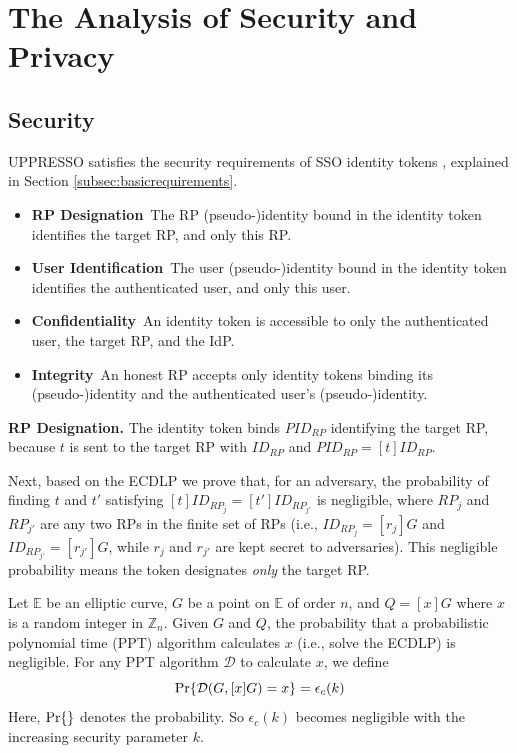 \section{The Analysis of Security and Privacy}
\label{sec:analysis}


\subsection{Security}
UPPRESSO satisfies the security requirements of SSO identity tokens \cite{ArmandoCCCT08,FettKS16, FettKS17},
     explained in Section \ref{subsec:basicrequirements}.
\begin{itemize}
\setlength{\topsep}{0pt}
\setlength{\partopsep}{0pt}
\setlength{\itemsep}{0pt}
\setlength{\parsep}{0pt}
\setlength{\parskip}{0pt}
\item  \textbf{RP Designation}~The RP (pseudo-)identity bound in the identity token
     identifies the target RP, and only this RP.
\item \textbf{User Identification}~The user (pseudo-)identity bound in the identity token identifies
        the authenticated user, and only this user.
\item \textbf{Confidentiality}~An identity token
    is accessible to only
                the authenticated user, the target RP, and the IdP.
\item \textbf{Integrity}~An honest RP accepts only identity tokens binding its (pseudo-)identity and the authenticated user's (pseudo-)identity.
\end{itemize}


\noindent\textbf{RP Designation.}
The identity token binds $PID_{RP}$ identifying the target RP,
    because $t$ is sent to the target RP with $ID_{RP}$ and $PID_{RP} = [t]ID_{RP}$.


Next, based on the ECDLP
    we prove that,
    for an adversary,
        the probability of finding $t$ and $t'$
    satisfying $[t]ID_{RP_j} = [t']ID_{RP_{j'}}$ is negligible,
    where $RP_j$ and $RP_{j'}$ are any two RPs in the finite set of RPs (i.e.,
    $ID_{RP_j} = [r_j]G$ and $ID_{RP_{j'}} = [r_{j'}]G$, while $r_j$ and $r_{j'}$ are kept secret to adversaries).
This negligible probability means the token designates \emph{only} the target RP.

Let $\mathbb{E}$ be an elliptic curve, %
    $G$ be a point on $\mathbb{E}$ of order $n$,
        and $Q = [x]G$ where $x$ is a random integer in $\mathbb{Z}_n$.
Given $G$ and $Q$,
    the probability that a probabilistic polynomial time (PPT) algorithm calculates $x$ (i.e., solve the ECDLP) is negligible.
For any PPT algorithm $\mathcal{D}$ to calculate $x$, we define
\begin{equation*}
{\rm Pr}\{\mathcal{D}(G, [x]G)=x\} = \epsilon_{c}(k)
\end{equation*}
Here, ${\rm Pr}\{\}$ denotes the probability.
So $\epsilon_{c}(k)$ becomes negligible with the increasing security parameter $k$.

